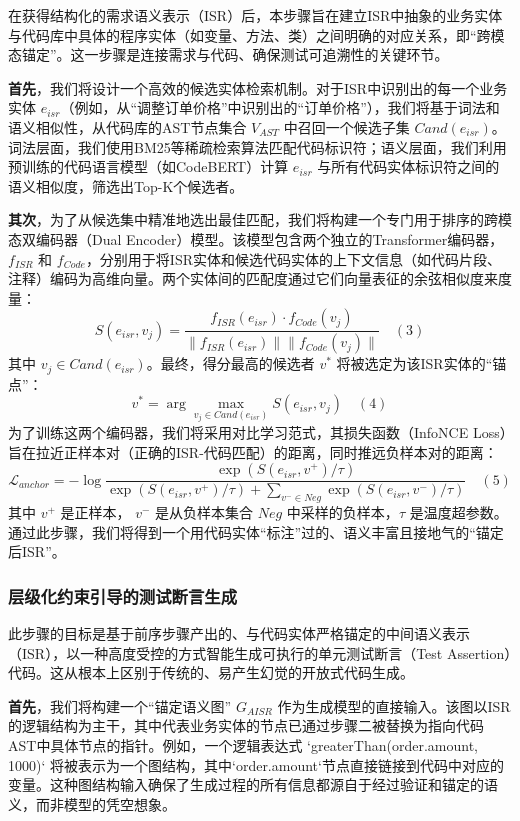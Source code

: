 \documentclass[12pt]{article}
\begin{document}
在获得结构化的需求语义表示（ISR）后，本步骤旨在建立ISR中抽象的业务实体与代码库中具体的程序实体（如变量、方法、类）之间明确的对应关系，即“跨模态锚定”。这一步骤是连接需求与代码、确保测试可追溯性的关键环节。

\textbf{首先}，我们将设计一个高效的候选实体检索机制。对于ISR中识别出的每一个业务实体 $e_{isr}$（例如，从“调整订单价格”中识别出的“订单价格”），我们将基于词法和语义相似性，从代码库的AST节点集合 $V_{AST}$ 中召回一个候选子集 $Cand(e_{isr})$。词法层面，我们使用BM25等稀疏检索算法匹配代码标识符；语义层面，我们利用预训练的代码语言模型（如CodeBERT）计算 $e_{isr}$ 与所有代码实体标识符之间的语义相似度，筛选出Top-K个候选者。

\textbf{其次}，为了从候选集中精准地选出最佳匹配，我们将构建一个专门用于排序的跨模态双编码器（Dual Encoder）模型。该模型包含两个独立的Transformer编码器，$f_{ISR}$ 和 $f_{Code}$，分别用于将ISR实体和候选代码实体的上下文信息（如代码片段、注释）编码为高维向量。两个实体间的匹配度通过它们向量表征的余弦相似度来度量：
$$
S(e_{isr}, v_j) = \frac{f_{ISR}(e_{isr}) \cdot f_{Code}(v_j)}{\|f_{ISR}(e_{isr})\| \|f_{Code}(v_j)\|} \quad (3)
$$
其中 $v_j \in Cand(e_{isr})$。最终，得分最高的候选者 $v^*$ 将被选定为该ISR实体的“锚点”：
$$
v^* = \arg\max_{v_j \in Cand(e_{isr})} S(e_{isr}, v_j) \quad (4)
$$
为了训练这两个编码器，我们将采用对比学习范式，其损失函数（InfoNCE Loss）旨在拉近正样本对（正确的ISR-代码匹配）的距离，同时推远负样本对的距离：
$$
\mathcal{L}_{anchor} = - \log \frac{\exp(S(e_{isr}, v^+)/\tau)}{\exp(S(e_{isr}, v^+)/\tau) + \sum_{v^- \in Neg} \exp(S(e_{isr}, v^-)/\tau)} \quad (5)
$$
其中 $v^+$ 是正样本， $v^-$ 是从负样本集合 $Neg$ 中采样的负样本，$\tau$ 是温度超参数。通过此步骤，我们将得到一个用代码实体“标注”过的、语义丰富且接地气的“锚定后ISR”。

\subsubsection{层级化约束引导的测试断言生成}

此步骤的目标是基于前序步骤产出的、与代码实体严格锚定的中间语义表示（ISR），以一种高度受控的方式智能生成可执行的单元测试断言（Test Assertion）代码。这从根本上区别于传统的、易产生幻觉的开放式代码生成。

\textbf{首先}，我们将构建一个“锚定语义图” $G_{AISR}$ 作为生成模型的直接输入。该图以ISR的逻辑结构为主干，其中代表业务实体的节点已通过步骤二被替换为指向代码AST中具体节点的指针。例如，一个逻辑表达式 `greaterThan(order.amount, 1000)` 将被表示为一个图结构，其中`order.amount`节点直接链接到代码中对应的变量。这种图结构输入确保了生成过程的所有信息都源自于经过验证和锚定的语义，而非模型的凭空想象。
\end{document}
